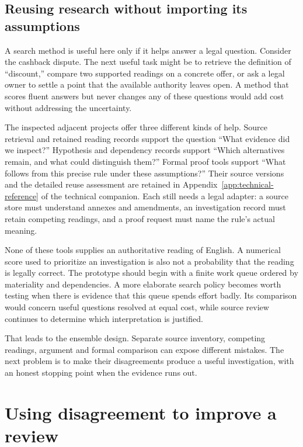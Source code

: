 \documentclass[12pt,a4paper,oneside,openany]{book}
\begin{document}
\section{Reusing research without importing its assumptions}
\label{sec:reader-reuse}

A search method is useful here only if it helps answer a legal question. Consider
the cashback dispute. The next useful task might be to retrieve the definition of
``discount,'' compare two supported readings on a concrete offer, or ask a legal
owner to settle a point that the available authority leaves open. A method that
scores fluent answers but never changes any of these questions would add cost
without addressing the uncertainty.

The inspected adjacent projects offer three different kinds of help. Source
retrieval and retained reading records support the question ``What evidence did
we inspect?'' Hypothesis and dependency records support ``Which alternatives
remain, and what could distinguish them?'' Formal proof tools support ``What
follows from this precise rule under these assumptions?'' Their source versions
and the detailed reuse assessment are retained in
Appendix~\ref{app:technical-reference} of the technical companion. Each still needs a legal adapter: a
source store must understand annexes and amendments, an investigation record must
retain competing readings, and a proof request must name the rule's actual
meaning.

None of these tools supplies an authoritative reading of English. A numerical
score used to prioritize an investigation is also not a probability that the
reading is legally correct. The prototype should begin with a finite work queue
ordered by materiality and dependencies. A more elaborate search policy becomes
worth testing when there is evidence that this queue spends effort badly. Its
comparison would concern useful questions resolved at equal cost, while source
review continues to determine which interpretation is justified.

That leads to the ensemble design. Separate source inventory, competing readings,
argument and formal comparison can expose different mistakes. The next problem
is to make their disagreements produce a useful investigation, with an honest
stopping point when the evidence runs out.

\chapter{Using disagreement to improve a review}
\label{ch:ensemble}
\end{document}
